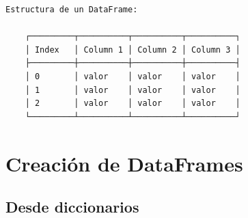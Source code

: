 \documentclass[
  doc,
  floatsintext,
  longtable,
  a4paper,
  nolmodern,
  notxfonts,
  notimes,
  12pt,
  colorlinks=true,linkcolor=blue,citecolor=blue,urlcolor=blue]{apa7}
\begin{document}
\begin{verbatim}
Estructura de un DataFrame:

    ┌─────────┬──────────┬──────────┬──────────┐
    │ Index   │ Column 1 │ Column 2 │ Column 3 │
    ├─────────┼──────────┼──────────┼──────────┤
    │ 0       │ valor    │ valor    │ valor    │
    │ 1       │ valor    │ valor    │ valor    │
    │ 2       │ valor    │ valor    │ valor    │
    └─────────┴──────────┴──────────┴──────────┘
\end{verbatim}

\section{Creación de DataFrames}\label{creaciuxf3n-de-dataframes}

\subsection{Desde diccionarios}\label{desde-diccionarios}
\end{document}
